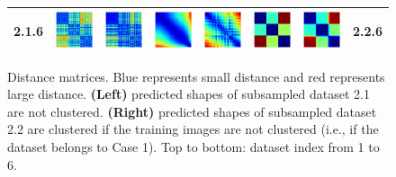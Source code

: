 \documentclass[bachelor, nocolorlinks, printoneside]{seuthesis} %
\begin{document}
\begin{Main}
\begin{figure}[ht!]
\begin{centering}
\begin{tabular}{cccc|cccc}
        2.1.6 &\includegraphics[width=0.12\columnwidth,keepaspectratio]{figs/toy_triangle/cluster_converge_3by30_6_1.png} &
        \includegraphics[width=0.12\columnwidth,keepaspectratio]{figs/toy_triangle/cluster_converge_3by30_6_2.png} &
        \includegraphics[width=0.12\columnwidth,keepaspectratio]{figs/toy_triangle/cluster_converge_3by30_6_3.png} &  
        \includegraphics[width=0.12\columnwidth,keepaspectratio]{figs/toy_triangle/cluster_converge_3by16_6_1.png} &
        \includegraphics[width=0.12\columnwidth,keepaspectratio]{figs/toy_triangle/cluster_converge_3by16_6_2.png} &
        \includegraphics[width=0.12\columnwidth,keepaspectratio]{figs/toy_triangle/cluster_converge_3by16_6_3.png}& 2.2.6\\
        \bottomrule  
        \end{tabular}  \vspace{-2mm}
        \caption{\small Distance matrices. Blue represents small distance and red represents large distance. {\bf (Left)} predicted shapes of subsampled dataset 2.1 are not clustered. {\bf (Right)} predicted shapes of subsampled dataset 2.2 are clustered if the training images are not clustered (i.e., if the dataset belongs to Case 1). Top to bottom: dataset index from 1 to 6.}
        \label{fig:triangle_cluster_visualization}
    \end{centering}
    \end{figure}


\end{Main}
\end{document}
